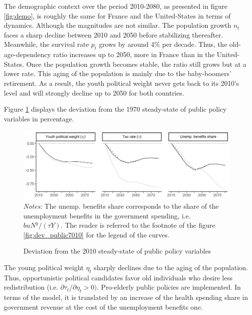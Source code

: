 The demographic context over the period 2010-2080, as presented in figure \ref{fig:demo}, is roughly the same for France and the United-States in terms of dynamics. Although the magnitudes are not similar. The population growth $n_t$ faces a sharp decline between 2010 and 2050 before stabilizing thereafter. Meanwhile, the survival rate $p_t$ grows by around 4\% per decade. Thus, the old-age-dependency ratio increases up to 2050, more in France than in the United-States. Once the population growth becomes stable, the ratio still grows but at a lower rate. This aging of the population is mainly due to the baby-boomers' retirement. As a result, the youth political weight never gets back to its 2010's level and will strongly decline up to 2050 for both countries.


Figure \ref{fig:dev_public1080} displays the deviation from the 1970 steady-state of public policy variables in percentage.
\begin{figure}[tb]
	\centering
	\caption{Deviation from the 2010 steady-state of public policy variables} \label{fig:dev_public1080}
	\includegraphics[width=1\linewidth]{../result/deviation/dev_public1080.png}
	\vspace{-6ex}
	\justify\singlespacing\footnotesize \textit{Notes:} The unemp. benefits share corresponds to the share of the unemployment benefits in the government spending, i.e. $buN^y/(\tau Y)$. The reader is referred to the footnote of the figure \ref{fig:dev_public7010} for the legend of the curves.
\end{figure}
The young political weight $\eta_t$ sharply declines due to the aging of the population. Thus, opportunistic political candidates favor old individuals who desire less redistribution (i.e. $\partial\tau_t / \partial \eta_t > 0)$. Pro-elderly public policies are implemented. In terms of the model, it is translated by an increase of the health spending share in government revenue at the cost of the unemployment benefits one.

